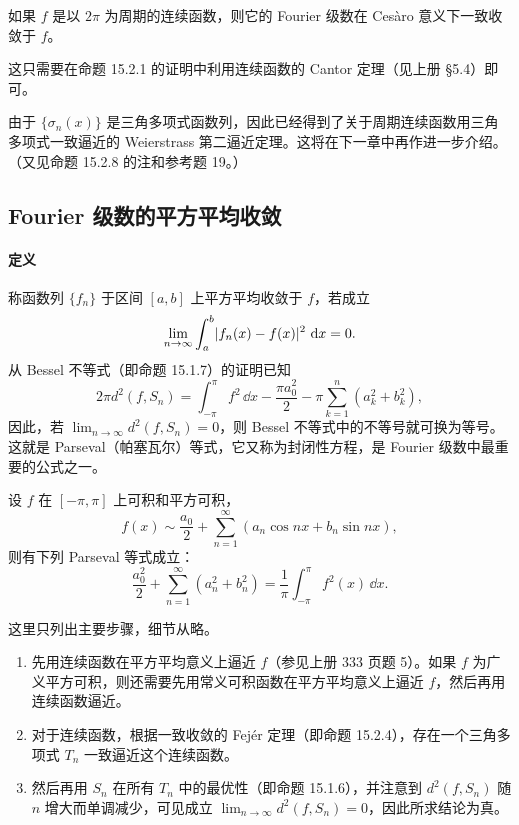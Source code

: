 \begin{xproposition}
如果 $f$ 是以 $2\pi$ 为周期的连续函数，则它的 Fourier 级数在 Cesàro 意义下一致收敛于 $f$。
\end{xproposition}

\begin{xremark}
这只需要在命题 15.2.1 的证明中利用连续函数的 Cantor 定理（见上册 §5.4）即可。
\end{xremark}

\begin{xremark}
由于 $\{\sigma_n(x)\}$ 是三角多项式函数列，因此已经得到了关于周期连续函数用三角多项式一致逼近的 Weierstrass 第二逼近定理。这将在下一章中再作进一步介绍。（又见命题 15.2.8 的注和参考题 19。）
\end{xremark}

\subsection{Fourier 级数的平方平均收敛}

\paragraph{定义}
称函数列 $\{f_n\}$ 于区间 $[a,b]$ 上平方平均收敛于 $f$，若成立
\[
  \lim_{n\to\infty}\int_a^b\lvert f_n(x)-f(x)\rvert^2\,\mathop{}\!\mathrm{d} x=0.
\]
从 Bessel 不等式（即命题 15.1.7）的证明已知
\[
  2\pi d^2(f,S_n)=\int_{-\pi}^{\pi}f^2\,\dd x-\frac{\pi a_0^2}{2}-\pi\sum_{k=1}^{n}(a_k^2+b_k^2),
\]
因此，若 $\lim_{n\to\infty}d^2(f,S_n)=0$，则 Bessel 不等式中的不等号就可换为等号。这就是 Parseval（帕塞瓦尔）等式，它又称为封闭性方程，是 Fourier 级数中最重要的公式之一。

\begin{xproposition}[15.2.5（Parseval 等式）]
设 $f$ 在 $[-\pi,\pi]$ 上可积和平方可积，
\[
  f(x)\sim\frac{a_0}{2}+\sum_{n=1}^{\infty}(a_n\cos nx+b_n\sin nx),
\]
则有下列 Parseval 等式成立：
\begin{equation}
  \frac{a_0^2}{2}+\sum_{n=1}^{\infty}(a_n^2+b_n^2)
  =\frac1\pi\int_{-\pi}^{\pi}f^2(x)\,\dd x.
  \tag{15.22}
  \label{eq:15.22}
\end{equation}
\end{xproposition}

\begin{xproof}
这里只列出主要步骤，细节从略。
\begin{enumerate}[label=(\arabic*)]
  \item 先用连续函数在平方平均意义上逼近 $f$（参见上册 333 页题 5）。如果 $f$ 为广义平方可积，则还需要先用常义可积函数在平方平均意义上逼近 $f$，然后再用连续函数逼近。
  \item 对于连续函数，根据一致收敛的 Fejér 定理（即命题 15.2.4），存在一个三角多项式 $T_n$ 一致逼近这个连续函数。
  \item 然后再用 $S_n$ 在所有 $T_n$ 中的最优性（即命题 15.1.6），并注意到 $d^2(f,S_n)$ 随 $n$ 增大而单调减少，可见成立 $\lim_{n\to\infty}d^2(f,S_n)=0$，因此所求结论为真。
\end{enumerate}
\end{xproof}

